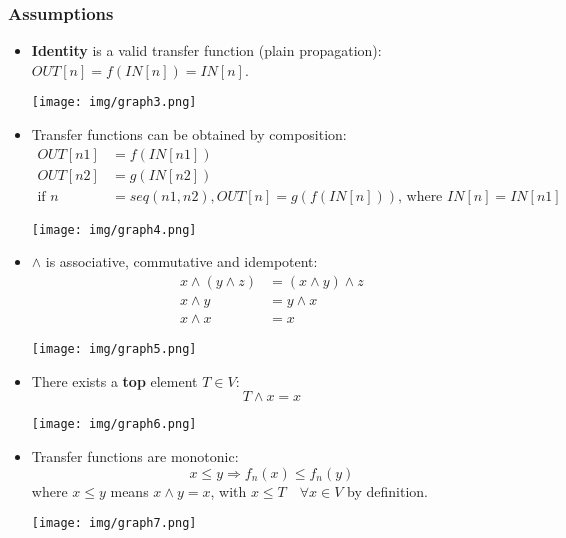 \documentclass[a4paper, 10pt, titlepage]{article}
\begin{document}
\subsubsection{Assumptions}
\begin{itemize}
\item \textbf{Identity} is a valid transfer function (plain propagation): $OUT[n] = f(IN[n]) = IN[n]$.
\begin{center}
\texttt{[image: img/graph3.png]}
\end{center}

\item Transfer functions can be obtained by composition:
\begin{align*}
OUT[n1] &= f(IN[n1]) \\
OUT[n2] &= g(IN[n2]) \\
\text{if }n &= seq(n1, n2), OUT[n] = g(f(IN[n]))\text{, where } IN[n] = IN[n1]
\end{align*}
\vspace*{-5mm}
\begin{center}
\texttt{[image: img/graph4.png]}
\end{center}

\item $\wedge$ is associative, commutative and idempotent:
\begin{align*}
x \wedge (y \wedge z) &= (x \wedge y) \wedge z \\
x \wedge y &= y \wedge x \\
x \wedge x &= x
\end{align*}
\vspace*{-5mm}
\begin{center}
\texttt{[image: img/graph5.png]}
\end{center}

\item There exists a \textbf{top} element $T \in V$:
$$T \wedge x = x$$
\vspace*{-5mm}
\begin{center}
\texttt{[image: img/graph6.png]}
\end{center}

\item Transfer functions are monotonic:
$$x \leq y \Rightarrow f_n(x) \leq f_n(y)$$
where $x \leq y$ means $x \wedge y = x$, with $x \leq T \quad \forall x \in V$ by definition.
\begin{center}
\texttt{[image: img/graph7.png]}
\end{center}

\end{itemize}
\end{document}
